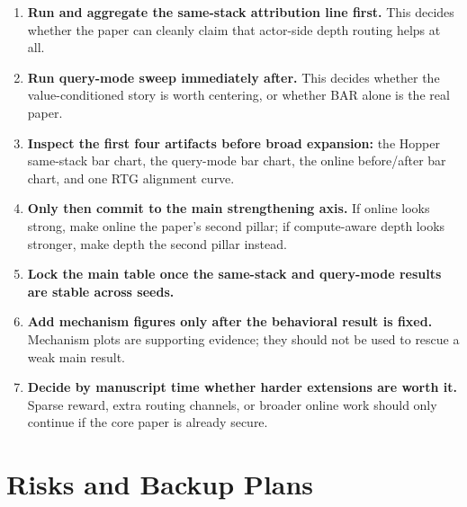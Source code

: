 \documentclass[11pt]{article}
\begin{document}
\begin{enumerate}
  \item \textbf{Run and aggregate the same-stack attribution line first.} This decides whether the paper can cleanly claim that actor-side depth routing helps at all.
  \item \textbf{Run query-mode sweep immediately after.} This decides whether the value-conditioned story is worth centering, or whether BAR alone is the real paper.
  \item \textbf{Inspect the first four artifacts before broad expansion:} the Hopper same-stack bar chart, the query-mode bar chart, the online before/after bar chart, and one RTG alignment curve.
  \item \textbf{Only then commit to the main strengthening axis.} If online looks strong, make online the paper's second pillar; if compute-aware depth looks stronger, make depth the second pillar instead.
  \item \textbf{Lock the main table once the same-stack and query-mode results are stable across seeds.}
  \item \textbf{Add mechanism figures only after the behavioral result is fixed.} Mechanism plots are supporting evidence; they should not be used to rescue a weak main result.
  \item \textbf{Decide by manuscript time whether harder extensions are worth it.} Sparse reward, extra routing channels, or broader online work should only continue if the core paper is already secure.
\end{enumerate}

\section{Risks and Backup Plans}
\end{document}
